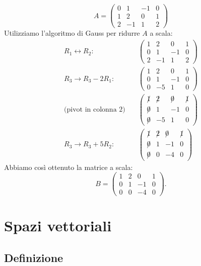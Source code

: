 \documentclass[
  a4paper,
]{article}
\begin{document}
\begin{examplebox}
\[
A=
\begin{pmatrix}
0 & 1 & -1 & 0\\
1 & 2 & 0 & 1\\
2 & -1 & 1 & 2
\end{pmatrix}
\] Utilizziamo l'algoritmo di Gauss per ridurre \(A\) a scala: \[
\begin{aligned}
R_1 \leftrightarrow R_2:\quad
&\begin{pmatrix}
1 & 2 & 0 & 1\\
0 & 1 & -1 & 0\\
2 & -1 & 1 & 2
\end{pmatrix}
\\[10pt]
R_3 \to R_3 - 2R_1:\quad
&\begin{pmatrix}
1 & 2 & 0 & 1\\
0 & 1 & -1 & 0\\
0 & -5 & 1 & 0
\end{pmatrix}
\\[10pt]
\text{(pivot in colonna 2)}\quad
&\begin{pmatrix}
\not 1 & \not 2 & \not 0 & \not 1\\
\not 0 & 1 & -1 & 0\\
\not 0 & -5 & 1 & 0
\end{pmatrix}
\\[10pt]
R_3 \to R_3 + 5R_2:\quad
&\begin{pmatrix}
\not 1 & \not 2 & \not 0 & \not 1\\
\not 0 & 1 & -1 & 0\\
\not 0 & 0 & -4 & 0
\end{pmatrix}
\end{aligned}
\]Abbiamo così ottenuto la matrice a scala: \[
B=
\begin{pmatrix}
1 & 2 & 0 & 1\\
0 & 1 & -1 & 0\\
0 & 0 & -4 & 0
\end{pmatrix}.
\]
\end{examplebox}

\newpage

\hypertarget{spazi-vettoriali}{%
\section{Spazi vettoriali}\label{spazi-vettoriali}}

\hypertarget{definizione}{%
\subsection{Definizione}\label{definizione}}
\end{document}
